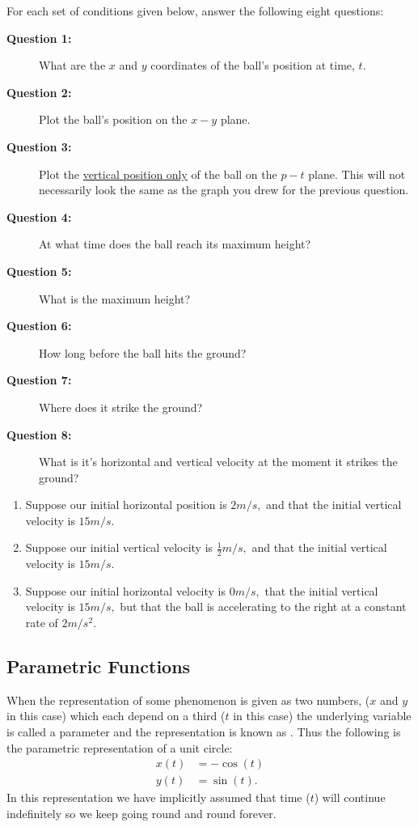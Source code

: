 \begin{embeddedproblem}{}
  For each set of conditions given below, answer the following eight questions:
  \begin{description}
  \item[{\bf Question 1:}] What are the $x$ and $y$ coordinates of the ball's
    position at time, $t.$
  \item[{\bf Question 2:}] Plot the ball's position on the $x-y$ plane.
  \item[{\bf Question 3:}] Plot the \underline{vertical position only} of the ball
    on the $p-t$ plane. This will not necessarily look the same
    as the graph you drew for the previous question. 
    \item[{\bf Question 4:}] At what time does the ball reach its maximum height?
    \item[{\bf Question 5:}] What is the maximum height?
    \item[{\bf Question 6:}] How long before the ball hits the ground?
    \item[{\bf Question 7:}] Where does it strike the ground?
    \item[{\bf Question 8:}] What is it's horizontal and vertical velocity at the moment
      it strikes the ground?
    \end{description}
    
  \begin{enumerate}[label={\bf{}(\alph*)}]
  \item Suppose our initial horizontal position is $2 m/s,$ and that
    the initial vertical velocity is $15 m/s.$
  \item Suppose our initial vertical velocity is $\frac{1}{2} m/s,$ and that
    the initial vertical velocity is $15 m/s.$
  \item Suppose our initial horizontal velocity is $0 m/s,$ that
    the initial vertical velocity is $15 m/s,$ but that the ball is
    accelerating to the right at a constant rate of $2 m/s^2.$
  \end{enumerate}
\end{embeddedproblem}

\subsection*{Parametric Functions}
When the representation of some phenomenon is given as two numbers,
($x$ and $y$ in this case) which each depend on a third ($t$ in this
case) the underlying variable is called a parameter and the
representation is known as . Thus the following is the
parametric representation of a unit circle:
\begin{align*}
  x(t) &= -\cos(t)\\
  y(t) &= \sin(t).
\end{align*}
In this representation we have implicitly assumed that time ($t$) will
continue indefinitely so we keep going round and round forever.

